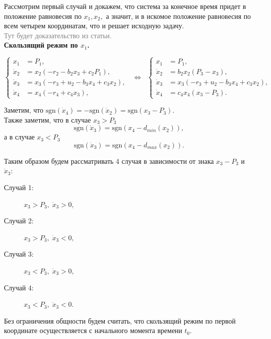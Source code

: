 \documentclass[11pt]{article}
\newcommand\beq{\begin{equation}}
\newcommand\eeq{\end{equation}}
\begin{document}
Рассмотрим первый случай и докажем, что система за конечное время придет в положение равновесия по $x_1, x_2,$ а значит, и в искомое положение равновесия по всем четырем координатам, что и решает исходную задачу. \\

\textcolor{gray}{Тут будет доказательство из статьи.}\\

{\bf Скользящий режим по $x_1$.}

\beq
\left\{
\begin{aligned}
	x_1 &= P_1, \\
	\dot x_2 &= x_2(-r_2 - b_2x_3 + c_2P_1), \\
	\dot x_3 &= x_3(-r_3 + u_2 - b_3x_4 + c_3x_2), \\
	\dot x_4 &= x_4(-r_4 + c_4x_3), 
\end{aligned}
\right. \;\; \Leftrightarrow \;\;
\left\{
\begin{aligned}
	x_1 &= P_1, \\
	\dot x_2 &= b_2x_2(P_3 - x_3), \\
	\dot x_3 &= x_3(-r_3 + u_2 - b_3x_4 + c_3x_2), \\
	\dot x_4 &= c_4x_4(x_3 - P_3). 	
\end{aligned}
\label{system1}
\right.
\eeq

Заметим, что $\text{sgn}(\dot x_4) = -\text{sgn}(\dot x_2) = \text{sgn}(x_3 - P_3).$ \\
Также заметим, что в случае $x_3 > P_3$ $$\text{sgn}(\dot x_3) =  \text{sgn}(x_4 - d_{min}(x_2)),$$ а в случае $x_3 < P_3$ $$\text{sgn}(\dot x_3) = \text{sgn}(x_4 -d_{max}(x_2)).$$

Таким образом будем рассматривать 4 случая в зависимости от знака $x_3 - P_3$ и $\dot x_3:$


\begin{description}
	\item[Случай 1:] $x_3 > P_3, \; \dot x_3 > 0,$
	\item[Случай 2:] $x_3 > P_3, \; \dot x_3 < 0,$
	\item[Случай 3:] $x_3 < P_3, \; \dot x_3 > 0,$
	\item[Случай 4:] $x_3 < P_3, \; \dot x_3 < 0.$
\end{description}

Без ограничения общности будем считать, что скользящий режим по первой координате осуществляется с начального момента времени $t_0$.\\
\end{document}
